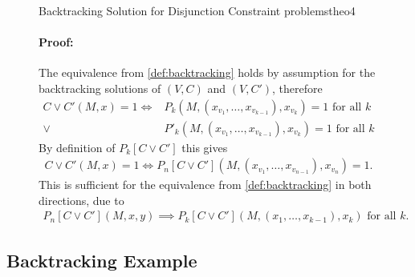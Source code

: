 \begin{figure}[p]
\begin{theorem}{Backtracking Solution for Disjunction Constraint problems}{theo4}
        \paragraph*{Proof:} The equivalence from \autoref{def:backtracking}
                            holds by assumption for the backtracking solutions
                            of $(V,C)$ and $(V,C')$, therefore
        \begin{align*}
            C\mathrel\lor C'(M,x)=1\iff{}& P_k(M,(x_{v_1},\dots,x_{v_{k-1}}),x_{v_k})=1\text{ for all }k\\
                                  \mathrel\lor{}& P'_k(M,(x_{v_1},\dots,x_{v_{k-1}}),x_{v_k})=1\text{ for all }k
        \end{align*}
        By definition of $P_k[C\mathrel\lor C']$ this gives
        \begin{align*}
            C\mathrel\lor C'(M,x)=1\iff{}P_n[C\mathrel\lor C'](M,(x_{v_1},\dots,x_{v_{n-1}}),x_{v_n})=1.
        \end{align*}
        This is sufficient for the equivalence from \autoref{def:backtracking}
        in both directions, due to
        \begin{align*}
            P_n[C\mathrel\lor C'](M,x,y)\implies P_k[C\mathrel\lor C'](M,(x_1,\dots,x_{k-1}),x_k)\text{ for all }k.
        \end{align*}
    \end{theorem}
\end{figure}

\subsection{Backtracking Example}

